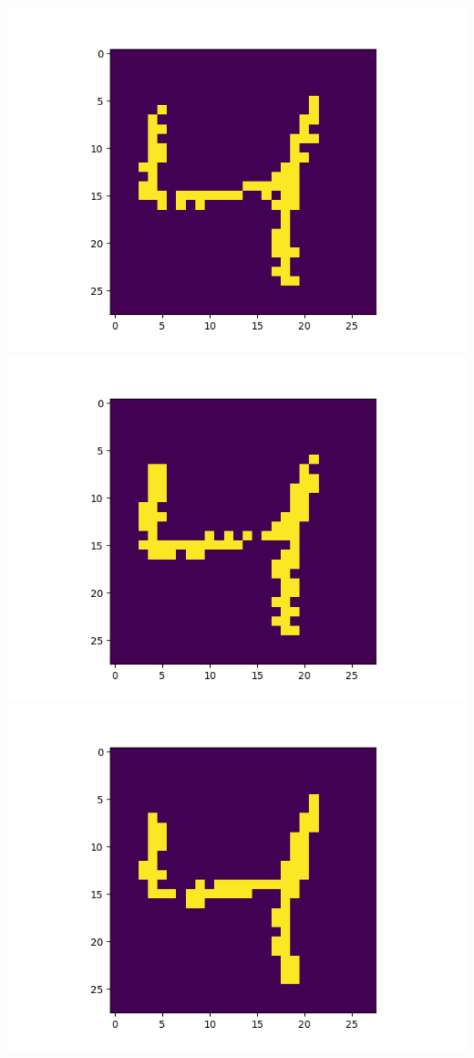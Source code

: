 \includegraphics[scale=0.2]{./bilder/comparison/prob/31}
\includegraphics[scale=0.2]{./bilder/comparison/prob/32}
\includegraphics[scale=0.2]{./bilder/comparison/prob/33}
